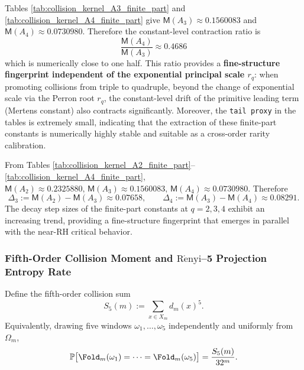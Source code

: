 \begin{remark}\label{rem:pom-collision-mertens-halving}
Tables \ref{tab:collision_kernel_A3_finite_part} and \ref{tab:collision_kernel_A4_finite_part} give
\(
\mathsf{M}(A_3)\approx 0.1560083
\)
and
\(
\mathsf{M}(A_4)\approx 0.0730980
\).
Therefore the constant-level contraction ratio is
\[
\boxed{\;
\frac{\mathsf{M}(A_4)}{\mathsf{M}(A_3)}\approx 0.4686\;}
\]
 which is numerically close to one half.
This ratio provides a \textbf{fine-structure fingerprint independent of the exponential principal scale \(r_q\)}: when promoting collisions from triple to quadruple,
beyond the change of exponential scale via the Perron root \(r_q\), the constant-level drift of the primitive leading term (Mertens constant) also contracts significantly.
Moreover, the \texttt{tail proxy} in the tables is extremely small, indicating that the extraction of these finite-part constants is numerically highly stable and suitable as a cross-order rarity calibration.
\end{remark}

\begin{remark}\label{rem:pom-collision-mertens-accel}
From Tables \ref{tab:collision_kernel_A2_finite_part}--\ref{tab:collision_kernel_A4_finite_part},
\(
\mathsf{M}(A_2)\approx 0.2325880,\,
\mathsf{M}(A_3)\approx 0.1560083,\,
\mathsf{M}(A_4)\approx 0.0730980
\).
Therefore
\[
\Delta_3:=\mathsf{M}(A_2)-\mathsf{M}(A_3)\approx 0.07658,\qquad
\Delta_4:=\mathsf{M}(A_3)-\mathsf{M}(A_4)\approx 0.08291.
\]
The decay step sizes of the finite-part constants at \(q=2,3,4\) exhibit an increasing trend, providing a fine-structure fingerprint that emerges in parallel with the near-RH critical behavior.
\end{remark}

\subsubsection{Fifth-Order Collision Moment and \texorpdfstring{$\mathrm{R\acute{e}nyi}$}{Renyi}--5 Projection Entropy Rate}\label{subsec:pom-s5}
\begin{definition}\label{def:pom-s5}
Define the fifth-order collision sum
$$
S_5(m):=\sum_{x\in X_m} d_m(x)^5.
$$
Equivalently, drawing five windows \(\omega_1,\dots,\omega_5\) independently and uniformly from \(\Omega_m\),
$$
\mathbb{P}\bigl[\Fold_m(\omega_1)=\cdots=\Fold_m(\omega_5)\bigr]=\frac{S_5(m)}{32^m}.
$$
\end{definition}

